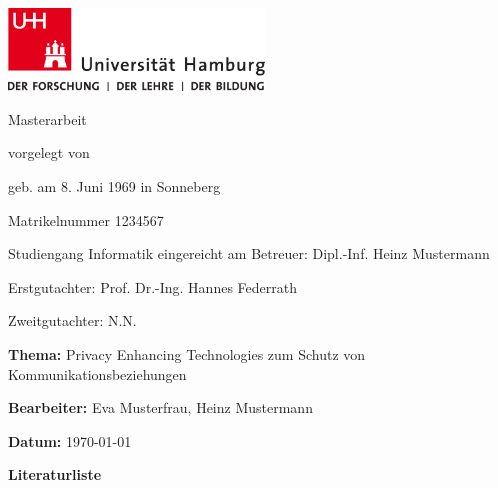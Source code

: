 \documentclass[
    fontsize=12pt,
    headings=small,
    parskip=half,           %
    bibliography=totoc,
    numbers=noenddot,       %
    open=any,               %
    ]{scrreprt}
\begin{document}
\newpage
\thispagestyle{empty}
\begin{titlepage}%
\includegraphics[width=6.8cm]{../pic/up-uhh-logo-u-2010-u-farbe-u-rgb.pdf}
\begin{center}\Large
	\vfill
	Masterarbeit
	\vfill
	\makeatletter
	{\Large\textsf{\textbf{\@title}}\par}
	\makeatother
	\vfill
	vorgelegt von
	\par\bigskip
	\makeatletter
	{\@author} \par
	\makeatother
	geb. am 8. Juni 1969 in Sonneberg \par
	Matrikelnummer 1234567 \par
	Studiengang Informatik
	\vfill
	\makeatletter
	eingereicht am {\@date}
	\makeatother
	\vfill
	Betreuer: Dipl.-Inf. Heinz Mustermann \par
	Erstgutachter: Prof. Dr.-Ing. Hannes Federrath \par
	Zweitgutachter: N.N.
\end{center}
\end{titlepage}%

\newpage
\thispagestyle{empty}
\label{sec:literaturliste}
\par\textbf{\textsf{Thema:}} Privacy Enhancing Technologies zum Schutz von Kommunikationsbeziehungen
\par\textbf{\textsf{Bearbeiter:}} Eva Musterfrau, Heinz Mustermann
\par\textbf{\textsf{Datum:}} \today
\bigskip
\par\textbf{\Large\textsf{Literaturliste}}
\end{document}
